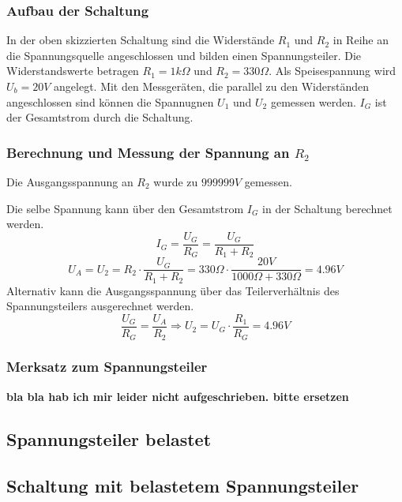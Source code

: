 \documentclass[
a4paper,     %
 headsepline, %
11pt         %
]{scrartcl}  %
\begin{document}
\subsubsection{Aufbau der Schaltung}

In der oben skizzierten Schaltung sind die Widerstände $R_{1}$  und $R_2$ in Reihe an die Spannungsquelle angeschlossen und bilden einen Spannungsteiler.
Die Widerstandswerte betragen $ R_1 = 1k \Omega$ und $R_2 = 330 \Omega$. 
Als Speisespannung wird $ U_b = 20V$ angelegt. 
Mit den Messgeräten, die parallel zu den Widerständen angeschlossen sind können die Spannugnen $U_{1}$ und $U_2$ gemessen werden. $I_G$ ist der Gesamtstrom durch die Schaltung.

\subsubsection{Berechnung und Messung der Spannung an $R_2$}

Die Ausgangsspannung an $R_2$ wurde zu \textbf{$999999V$} gemessen.

Die selbe Spannung kann über den Gesamtstrom $I_G$ in der Schaltung berechnet werden.
\[ I_G = \frac{U_G}{R_G} = \frac{U_G}{R_1 + R_2}  \]
\[ U_A = U_2 = R_2 \cdot \frac{U_G}{R_1 + R_2} =330\Omega \cdot \frac{20V}{1000\Omega+330\Omega} =4.96V \]
Alternativ kann die Ausgangsspannung über das Teilerverhältnis des Spannungsteilers ausgerechnet werden.
\[ \frac{U_G}{R_G}=\frac{U_A}{R_2} \Rightarrow U_2 = U_G \cdot \frac{R_1}{R_G} = 4.96V\]

\subsubsection{Merksatz zum Spannungsteiler}

\textbf{bla bla hab ich mir leider nicht aufgeschrieben. bitte ersetzen}

\subsection{Spannungsteiler belastet}
\subsection{Schaltung mit belastetem Spannungsteiler}
\end{document}
